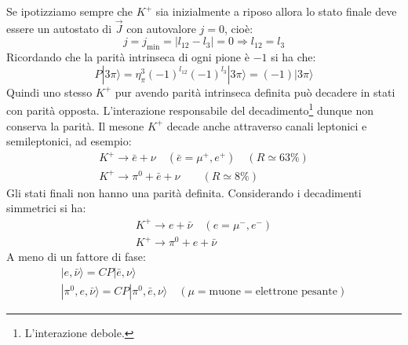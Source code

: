 Se ipotizziamo sempre che $K^+$ sia inizialmente a riposo allora lo stato 
finale deve essere un autostato di
$\vec{J}$ con autovalore $j=0$, cioè:
\[
j=j_{\text{min}}=|l_{12}-l_3|=0\Rightarrow l_{12}=l_3
\]
Ricordando che la parità intrinseca di ogni pione è $-1$ si ha che:
\[
P|3\pi\rangle=\eta_{\pi}^3(-1)^{l_{12}}(-1)^{l_3}|3\pi\rangle=(-1)|3\pi\rangle
\]
Quindi uno stesso $K^+$ pur avendo parità intrinseca definita può decadere in 
stati con parità opposta.
L'interazione responsabile del decadimento\footnote{L'interazione debole.} 
dunque non conserva la parità.
Il mesone $K^+$ decade anche attraverso canali leptonici e semileptonici, ad 
esempio:
\begin{gather}
K^+\rightarrow \bar{e}+\nu\quad(\bar{e}=\mu^+,e^+)\quad(R\simeq 63\%)\\
K^+\rightarrow \pi^0+\bar{e}+\nu\qquad(R\simeq 8\%)
\end{gather}
Gli stati finali non hanno una parità definita. Considerando i decadimenti 
simmetrici si ha:
\begin{gather}
K^+\rightarrow e+\bar{\nu}\quad(e=\mu^-,e^-)\\
K^+\rightarrow \pi^0+e+\bar{\nu}
\end{gather}
A meno di un fattore di fase:
\begin{gather}
|e,\bar{\nu}\rangle =CP|\bar{e},\nu\rangle\\
|\pi^0,e,\bar{\nu}\rangle 
=CP|\pi^0,\bar{e},\nu\rangle\quad(\mu=\text{muone}=\text{elettrone pesante})
\end{gather}

